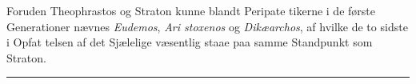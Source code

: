 \documentclass[12pt,a4paper]{book}
\newcommand{\divrule}{\begin{center}\rule{2cm}{0.4pt}\end{center}}
\begin{document}
Foruden Theophrastos og Straton kunne blandt Peripate\-%
tikerne i de første Generationer nævnes \emph{Eudemos}, \emph{Ari\-%
stoxenos} og \emph{Dikæarchos}, af hvilke de to sidste i Opfat\-%
telsen af det Sjælelige væsentlig staae paa samme Standpunkt
som Straton.
%
%
\divrule
\setcounter{footnote}{0}
\end{document}
